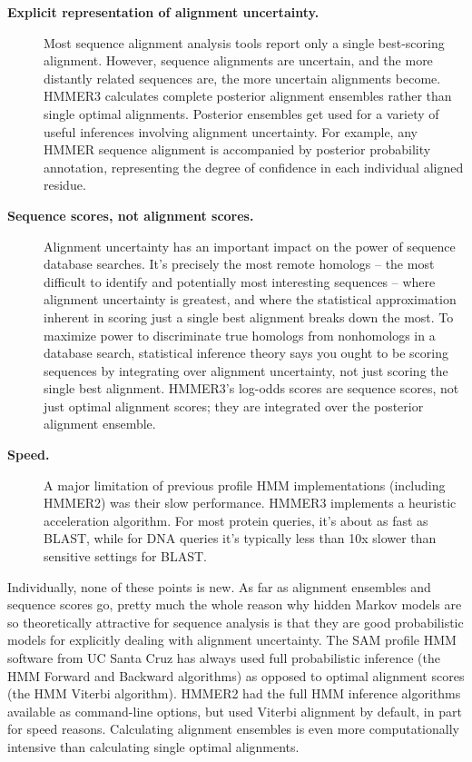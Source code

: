 \begin{description}
\item[\textbf{Explicit representation of alignment uncertainty.}]
  Most sequence alignment analysis tools report only a single
  best-scoring alignment. However, sequence alignments are uncertain,
  and the more distantly related sequences are, the more uncertain
  alignments become. HMMER3 calculates complete posterior alignment
  ensembles rather than single optimal alignments. Posterior ensembles
  get used for a variety of useful inferences involving alignment
  uncertainty. For example, any HMMER sequence alignment is
  accompanied by posterior probability annotation, representing the
  degree of confidence in each individual aligned residue.

\item[\textbf{Sequence scores, not alignment scores.}]  Alignment
  uncertainty has an important impact on the power of sequence
  database searches.  It's precisely the most remote homologs -- the
  most difficult to identify and potentially most interesting
  sequences -- where alignment uncertainty is greatest, and where the
  statistical approximation inherent in scoring just a single best
  alignment breaks down the most. To maximize power to discriminate
  true homologs from nonhomologs in a database search, statistical
  inference theory says you ought to be scoring sequences by
  integrating over alignment uncertainty, not just scoring the single
  best alignment. HMMER3's log-odds scores are sequence scores, not
  just optimal alignment scores; they are integrated over the
  posterior alignment ensemble.
  
\item[\textbf{Speed.}] A major limitation of previous profile HMM
  implementations (including HMMER2) was their slow performance. HMMER3
  implements a heuristic acceleration algorithm. For most protein 
  queries, it's about as fast as BLAST, while for DNA queries it's 
  typically less than 10x slower than sensitive settings for BLAST. 
\end{description}

Individually, none of these points is new. As far as alignment
ensembles and sequence scores go, pretty much the whole reason why
hidden Markov models are so theoretically attractive for sequence
analysis is that they are good probabilistic models for explicitly
dealing with alignment uncertainty. The SAM profile HMM software from
UC Santa Cruz has always used full probabilistic inference (the HMM
Forward and Backward algorithms) as opposed to optimal alignment
scores (the HMM Viterbi algorithm). HMMER2 had the full HMM inference
algorithms available as command-line options, but used Viterbi
alignment by default, in part for speed reasons. Calculating alignment
ensembles is even more computationally intensive than calculating
single optimal alignments.

